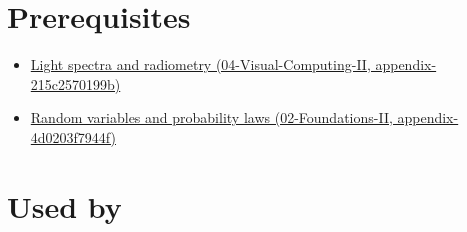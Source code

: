\section{Prerequisites}\label{appendix-4815cd87ab8b-prerequisites}

\begin{itemize}
\tightlist
\item
  \href{../04-Visual-Computing-II/main.pdf\#nameddest=appendix-215c2570199b}{Light spectra and radiometry (04-Visual-Computing-II, appendix-215c2570199b)}
\item
  \href{../02-Foundations-II/main.pdf\#nameddest=appendix-4d0203f7944f}{Random variables and probability laws (02-Foundations-II, appendix-4d0203f7944f)}
\end{itemize}

\section{Used by}\label{appendix-4815cd87ab8b-used-by}

